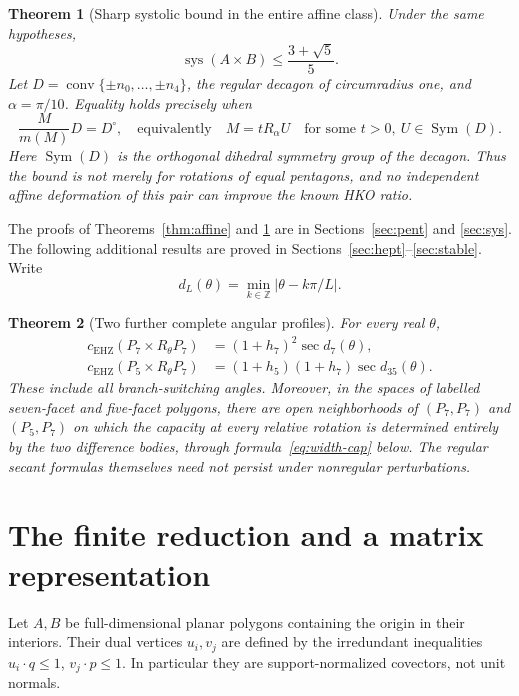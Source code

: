 \documentclass[11pt,a4paper]{article}
\newtheorem{theorem}{Theorem}[section]
\theoremstyle{definition}\newtheorem{definition}[theorem]{Definition}
\theoremstyle{remark}\newtheorem{remark}[theorem]{Remark}
\newcommand{\conv}{\operatorname{conv}}
\newcommand{\sys}{\operatorname{sys}}
\newcommand{\capc}{c_{\mathrm{EHZ}}}
\newcommand{\Sym}{\operatorname{Sym}}
\begin{document}
\begin{theorem}[Sharp systolic bound in the entire affine class]\label{thm:sys}
Under the same hypotheses,
\begin{equation}\label{eq:sys}
 \boxed{\displaystyle \sys(A\times B)\le\frac{3+\sqrt5}{5}.}
\end{equation}
Let $D=\conv\{\pm n_0,\ldots,\pm n_4\}$, the regular decagon of circumradius one, and $\alpha=\pi/10$. Equality holds precisely when
\begin{equation}\label{eq:equality}
 \frac{M}{m(M)}D=D^\circ,
 \quad\text{equivalently}\quad
 M=tR_\alpha U\quad\text{for some }t>0,\ U\in\Sym(D).
\end{equation}
Here $\Sym(D)$ is the orthogonal dihedral symmetry group of the decagon. Thus the bound is not merely for rotations of equal pentagons, and no independent affine deformation of this pair can improve the known HKO ratio.
\end{theorem}

The proofs of Theorems~\ref{thm:affine} and \ref{thm:sys} are in Sections~\ref{sec:pent} and \ref{sec:sys}. The following additional results are proved in Sections~\ref{sec:hept}--\ref{sec:stable}. Write
\[
 d_L(\theta)=\min_{k\in\mathbb Z}|\theta-k\pi/L|.
\]
\begin{theorem}[Two further complete angular profiles]\label{thm:hept-main}
For every real $\theta$,
\begin{align}
 \capc(P_7\times R_\theta P_7)&=(1+h_7)^2\sec d_7(\theta),\label{eq:77}\\
 \capc(P_5\times R_\theta P_7)&=(1+h_5)(1+h_7)\sec d_{35}(\theta).\label{eq:57}
\end{align}
These include all branch-switching angles. Moreover, in the spaces of labelled seven-facet and five-facet polygons, there are open neighborhoods of $(P_7,P_7)$ and $(P_5,P_7)$ on which the capacity at every relative rotation is determined entirely by the two difference bodies, through formula~\eqref{eq:width-cap} below. The regular secant formulas themselves need not persist under nonregular perturbations.
\end{theorem}

\section{The finite reduction and a matrix representation}\label{sec:reduction}
Let $A,B$ be full-dimensional planar polygons containing the origin in their interiors. Their dual vertices $u_i,v_j$ are defined by the irredundant inequalities $u_i\cdot q\le1$, $v_j\cdot p\le1$. In particular they are support-normalized covectors, not unit normals.
\end{document}
